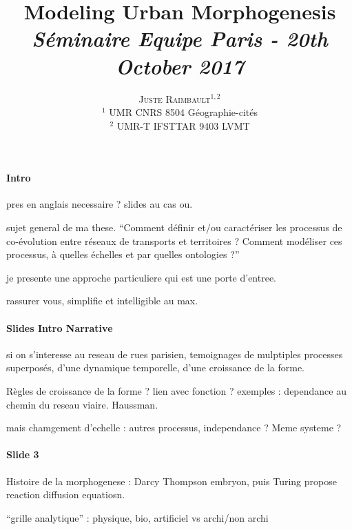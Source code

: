 \documentclass[11pt]{article}
\newcommand{\noun}[1]{\textsc{#1}}
\begin{document}
\title{Modeling Urban Morphogenesis
\bigskip\\
\textit{Séminaire Equipe Paris - 20th October 2017}
}
\author{\noun{Juste Raimbault}$^{1,2}$\medskip\\
$^1$ UMR CNRS 8504 Géographie-cités\\
$^2$ UMR-T IFSTTAR 9403 LVMT
}
\date{}

\maketitle

\justify



\paragraph{Intro}

pres en anglais necessaire ? slides au cas ou.

sujet general de ma these. ``Comment définir et/ou caractériser les processus de co-évolution entre réseaux de transports et territoires ? Comment modéliser ces processus, à quelles échelles et par quelles ontologies ?''

je presente une approche particuliere qui est une porte d'entree.

rassurer vous, simplifie et intelligible au max.



\paragraph{Slides Intro Narrative}

si on s'interesse au reseau de rues parisien, temoignages de mulptiples processes superposés, d'une dynamique temporelle, d'une croissance de la forme.

Règles de croissance de la forme ? lien avec fonction ? exemples : dependance au chemin du reseau viaire. Haussman.

mais chamgement d'echelle : autres processus, independance ? Meme systeme ?


\paragraph{Slide 3}

Histoire de la morphogenese : Darcy Thompson embryon, puis Turing propose reaction diffusion equatiosn.

``grille analytique'' : physique, bio, artificiel vs archi/non archi
\end{document}
